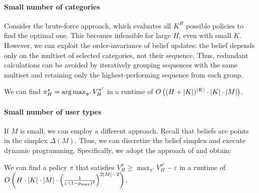 \paragraph{Small number of categories}
Consider the brute-force approach, which evaluates all $K^H$ possible policies to find the optimal one. This becomes infeasible for large $H$, even with small $K$. However, we can exploit the order-invariance of belief updates: the belief depends only on the multiset of selected categories, not their sequence. Thus, redundant calculations can be avoided by iteratively grouping sequences with the same multiset and retaining only the highest-performing sequence from each group.
\begin{proposition} \label{prop:backward-induction-approximation}
  We can find $\pi^\star_H = \operatorname*{arg\,max}_{\pi'} V^{\pi'}_H$ in a runtime of $O\left( (H + \lvert K\rvert) ^ {\lvert K\rvert} \cdot \lvert K\rvert \cdot \lvert M\rvert \right)$.
\end{proposition}
\paragraph{Small number of user types}
If $M$ is small, we can employ a different approach. Recall that beliefs are points in the simplex $\Delta(M)$. Thus, we can discretize the belief simplex and execute dynamic programming. Specifically, we adopt the approach of \citet{point-based-value-iteration-an-anytime-algorithm-for-pomdps} and obtain:
\begin{proposition} \label{prop:discretization-approximation}
  We can find a policy $\pi$ that satisfies $V^{\pi}_H \geq \max_{\pi'} V^{\pi'}_H - \varepsilon$ in a runtime of \\ $O\left( H \cdot \lvert K\rvert \cdot \lvert M\rvert \cdot \left( \frac{1}{\varepsilon \cdot (1 - p_{\max})^2} \right)^{2\lvert M\rvert - 2} \right)$.
\end{proposition}

